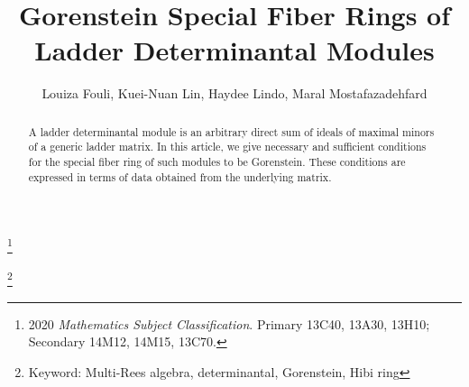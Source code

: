 \documentclass[11pt,a4paper,reqno,dvipsnames]{amsart}
\theoremstyle{plain}
\theoremstyle{definition}
\newtheorem{Assumptions and Discussion}[Theorem]{Assumptions and Discussion}
\theoremstyle{remark}
\begin{document}
\title[Gorenstein Special Fiber Rings of Ladder Determinantal Modules]{Gorenstein Special Fiber Rings of Ladder Determinantal Modules}

\author[ L. Fouli,  K.-N. Lin, H. Lindo,  M. Mostafazadehfard]{ Louiza Fouli,  Kuei-Nuan Lin, Haydee Lindo,  Maral Mostafazadehfard}



\thanks{2020 {\em Mathematics Subject Classification}.
    Primary 13C40, %
    13A30, %
    13H10; %
    Secondary 
    14M12, %
    14M15, %
    13C70. %
    }

\thanks{Keyword: Multi-Rees algebra, determinantal, Gorenstein, Hibi ring}


\address{Department of Mathematical Sciences, New Mexico State University, Las Cruces, NM 88003, USA}


\address{Department of Mathematics, The Penn State University, McKeesport, PA, 15132, USA}

\address{Department of Mathematics, Harvey Mudd College, Claremont, CA, 91711, USA}



\address{Institute of Mathematics, Federal University of Rio de Janeiro, RJ,
21941-909, Brazil}


\begin{abstract}
A ladder determinantal module is an arbitrary direct sum of ideals of maximal minors of a generic ladder matrix. In this article, we give necessary and sufficient conditions for the special fiber ring of such modules to be Gorenstein. These conditions are expressed in terms of data obtained from the underlying matrix.
\end{abstract}


\maketitle
\end{document}
